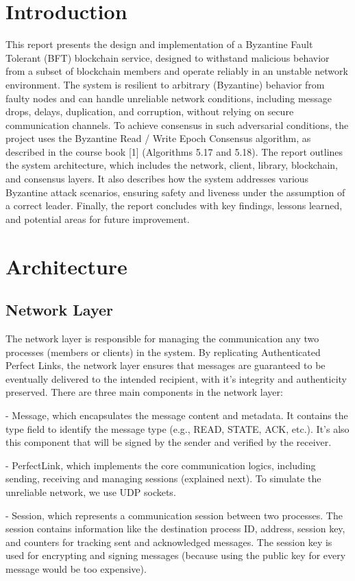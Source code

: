 \documentclass[runningheads]{llncs}
\begin{document}
\section{Introduction}
This report presents the design and implementation of a Byzantine Fault Tolerant
(BFT) blockchain service, designed to withstand malicious behavior from a subset
of blockchain members and operate reliably in an unstable network environment.
The system is resilient to arbitrary (Byzantine) behavior from faulty nodes and
can handle unreliable network conditions, including message drops, delays,
duplication, and corruption, without relying on secure communication channels.
To achieve consensus in such adversarial conditions, the project uses the
Byzantine Read / Write Epoch Consensus algorithm, as described in the course
book [1] (Algorithms 5.17 and 5.18). The report outlines the system
architecture, which includes the network, client, library, blockchain, and
consensus layers. It also describes how the system addresses various Byzantine
attack scenarios, ensuring safety and liveness under the assumption of a correct
leader. Finally, the report concludes with key findings, lessons learned, and
potential areas for future improvement.
%
\section{Architecture}
\subsection{Network Layer}
The network layer is responsible for managing the communication any two
processes (members or clients) in the system. By replicating Authenticated
Perfect Links, the network layer ensures that messages are guaranteed to be
eventually delivered to the intended recipient, with it's integrity and
authenticity preserved. There are three main components in the network layer: 

- Message, which encapsulates the message content and metadata. It contains the
type field to identify the message type (e.g., READ, STATE, ACK, etc.). It's
also this component that will be signed by the sender and verified by the
receiver. 

- PerfectLink, which implements the core communication logics, including
sending, receiving and managing sessions (explained next). To simulate the
unreliable network, we use UDP sockets. 

- Session, which represents a communication session between two processes. The
session contains information like the destination process ID, address, session
key, and counters for tracking sent and acknowledged messages. The session key
is used for encrypting and signing messages (because using the public key for
every message would be too expensive).
\end{document}

